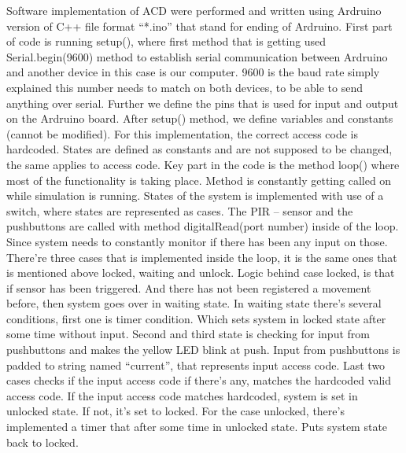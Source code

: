 Software implementation of ACD were performed and written using Ardruino version of C++ file format “*.ino” that stand for ending of Ardruino. First part of code is running setup(), where first method that is getting used Serial.begin(9600) method to establish serial communication between Ardruino and another device in this case is our computer. 9600 is the baud rate simply explained this number needs to match on both devices, to be able to send anything over serial. Further we define the pins that is used for input and output on the Ardruino board. 
\newline
After setup() method, we define variables and constants (cannot be modified). For this implementation, the correct access code is hardcoded. States are defined as constants and are not supposed to be changed, the same applies to access code.
\newline\newline
Key part in the code is the method loop() where most of the functionality is taking place. Method is constantly getting called on while simulation is running. States of the system is implemented with use of a switch, where states are represented as cases. The PIR – sensor and the pushbuttons are called with method digitalRead(port number) inside of the loop. Since system needs to constantly monitor if there has been any input on those.  
\newline\newline
There’re three cases that is implemented inside the loop, it is the same ones that is mentioned above locked, waiting and unlock. Logic behind case locked, is that if sensor has been triggered. And there has not been registered a movement before, then system goes over in waiting state. In waiting state there’s several conditions, first one is timer condition. Which sets system in locked state after some time without input. Second and third state is checking for input from pushbuttons and makes the yellow LED blink at push. Input from pushbuttons is padded to string named “current”, that represents input access code. Last two cases checks if the input access code if there’s any, matches the hardcoded valid access code. If the input access code matches hardcoded, system is set in unlocked state. If not, it’s set to locked. 
\newline\newline
For the case unlocked, there’s implemented a timer that after some time in unlocked state. Puts system state back to locked. 
